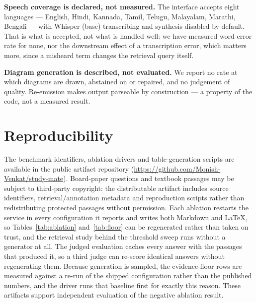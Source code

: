 \documentclass[conference]{IEEEtran}
\begin{document}
\textbf{Speech coverage is declared, not measured.} The interface accepts eight
languages --- English, Hindi, Kannada, Tamil, Telugu, Malayalam, Marathi,
Bengali --- with Whisper (base) transcribing and synthesis disabled by default.
That is what is accepted, not what is handled well: we have measured word error
rate for none, nor the downstream effect of a transcription error, which
matters more, since a misheard term changes the retrieval query itself.

\textbf{Diagram generation is described, not evaluated.} We report no rate at
which diagrams are drawn, abstained on or repaired, and no judgement of
quality. Re-emission makes output parseable by construction --- a property of
the code, not a measured result.

\section{Reproducibility}
The benchmark identifiers, ablation drivers and table-generation scripts
are available in the public artifact repository
(\url{https://github.com/Monish-Venkat/study-mate}).
Board-paper questions and textbook passages may be subject to third-party
copyright: the distributable artifact includes source identifiers,
retrieval/annotation metadata and reproduction scripts rather than
redistributing protected passages without permission. Each ablation restarts the service in every configuration it
reports and writes both Markdown and \LaTeX{}, so Tables~\ref{tab:ablation}
and~\ref{tab:floor} can be regenerated rather than taken on trust, and the
retrieval study behind the threshold sweep runs without a generator at all.
The judged evaluation caches every answer with the passages that produced it,
so a third judge can re-score identical answers without regenerating them.
Because generation is sampled, the evidence-floor rows are measured against a
re-run of the shipped configuration rather than the published numbers, and the
driver runs that baseline first for exactly this reason.
These artifacts support independent evaluation of the negative ablation
result.

\end{document}
